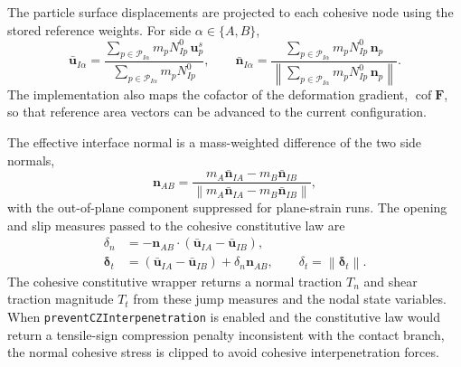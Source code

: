 The particle surface displacements are projected to each cohesive node using the stored reference weights.  For side $\alpha\in\{A,B\}$,
\begin{equation}
  \bar{\mathbf{u}}_{I\alpha}
  = \frac{\sum_{p\in \mathcal{P}_{I\alpha}} m_p N^0_{Ip}\,\mathbf{u}^s_p}
         {\sum_{p\in \mathcal{P}_{I\alpha}} m_p N^0_{Ip}},
  \qquad
  \bar{\mathbf{n}}_{I\alpha}
  = \frac{\sum_{p\in \mathcal{P}_{I\alpha}} m_p N^0_{Ip}\,\mathbf{n}_p}
         {\left\lVert\sum_{p\in \mathcal{P}_{I\alpha}} m_p N^0_{Ip}\,\mathbf{n}_p\right\rVert}.
  \label{eq:cz-grid-projection}
\end{equation}
The implementation also maps the cofactor of the deformation gradient, $\operatorname{cof}\mathbf{F}$, so that reference area vectors can be advanced to the current configuration.

The effective interface normal is a mass-weighted difference of the two side normals,
\begin{equation}
  \mathbf{n}_{AB}
  = \frac{m_A\bar{\mathbf{n}}_{IA}-m_B\bar{\mathbf{n}}_{IB}}
         {\left\lVert m_A\bar{\mathbf{n}}_{IA}-m_B\bar{\mathbf{n}}_{IB}\right\rVert},
  \label{eq:cz-effective-normal}
\end{equation}
with the out-of-plane component suppressed for plane-strain runs.  The opening and slip measures passed to the cohesive constitutive law are
\begin{align}
  \delta_n &= -\mathbf{n}_{AB}\cdot\left(\bar{\mathbf{u}}_{IA}-\bar{\mathbf{u}}_{IB}\right),\\
  \boldsymbol{\delta}_t
    &= \left(\bar{\mathbf{u}}_{IA}-\bar{\mathbf{u}}_{IB}\right)+\delta_n\mathbf{n}_{AB},
  \qquad
  \delta_t=\left\lVert\boldsymbol{\delta}_t\right\rVert.
  \label{eq:cz-jump}
\end{align}
The cohesive constitutive wrapper returns a normal traction $T_n$ and shear traction magnitude $T_t$ from these jump measures and the nodal state variables.  When \texttt{preventCZInterpenetration} is enabled and the constitutive law would return a tensile-sign compression penalty inconsistent with the contact branch, the normal cohesive stress is clipped to avoid cohesive interpenetration forces.

